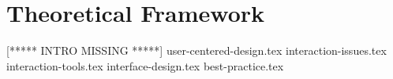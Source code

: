 \chapter{Theoretical Framework}
\label{theory}
[***** INTRO MISSING *****]
{user-centered-design.tex}
{interaction-issues.tex}
{interaction-tools.tex}
{interface-design.tex}
{best-practice.tex}
